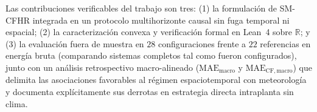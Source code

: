 Las contribuciones verificables del trabajo son tres: (1) la formulación de SM-CFHR integrada en un protocolo multihorizonte causal sin fuga temporal ni espacial; (2) la caracterización convexa y verificación formal en Lean~4 sobre $\mathbb{R}$; y (3) la evaluación fuera de muestra en $28$ configuraciones frente a $22$ referencias en energía bruta (comparando sistemas completos tal como fueron configurados), junto con un análisis retrospectivo macro-alineado ($\mathrm{MAE}_{\mathrm{macro}}$ y $\mathrm{MAE}_{\mathrm{CF,macro}}$) que delimita las asociaciones favorables al régimen espaciotemporal con meteorología y documenta explícitamente sus derrotas en estrategia directa intraplanta sin clima.
